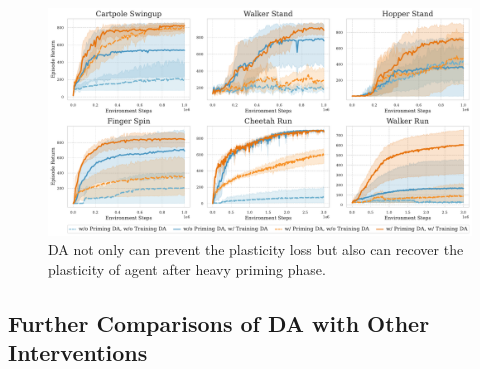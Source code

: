 \begin{figure}[ht]
  \centering
  \includegraphics[width=\textwidth]{Figures/5Appendix/heavy_priming_DA.pdf}
  \vspace{-\baselineskip}
  \caption{DA not only can prevent the plasticity loss but also can recover the plasticity of agent after heavy priming phase.}
  \label{appendix_fig:primingDA}
\end{figure}

\subsection{Further Comparisons of DA with Other Interventions}
\label{Appendix: Further_Comparisons}

